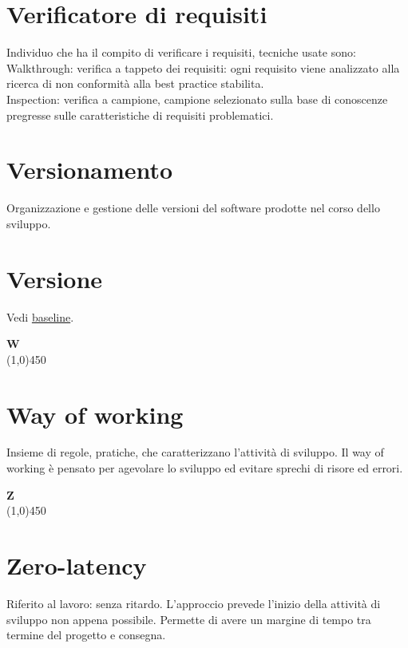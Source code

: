 \documentclass[11pt]{article}
\begin{document}
	\section{\LARGE Verificatore di requisiti}
	\label{sec:verificatorerequisiti}
	Individuo che ha il compito di verificare i requisiti, tecniche usate sono: \\
	Walkthrough: verifica a tappeto dei requisiti: ogni requisito viene analizzato alla ricerca di non conformità alla best practice stabilita. \\
	Inspection: verifica a campione, campione selezionato sulla base di conoscenze pregresse sulle caratteristiche di requisiti problematici.
	
	\section{\LARGE Versionamento}
	\label{sec:versionamento}
	Organizzazione e gestione delle versioni del software prodotte nel corso dello sviluppo.

	\section{\LARGE Versione}
	\label{sec:versione}
	Vedi \hyperref[sec:baseline]{baseline}. \newpage

	{\Huge{\textbf{W}}} \\
	\line(1,0){450}
	
	\section{\LARGE Way of working}
	\label{sec:wow}
	Insieme di regole, pratiche, che caratterizzano l'attività di sviluppo. Il way of working è pensato per agevolare lo sviluppo ed evitare sprechi di risore ed errori. \newpage

	
	{\Huge{\textbf{Z}}} \\
	\line(1,0){450}
	
	\section{\LARGE Zero-latency}
	\label{sec:zerolatency}
	Riferito al lavoro: senza ritardo. L'approccio prevede l'inizio della attività di sviluppo non appena possibile. Permette di avere un margine di tempo tra termine del progetto e consegna.
	
\end{document}
